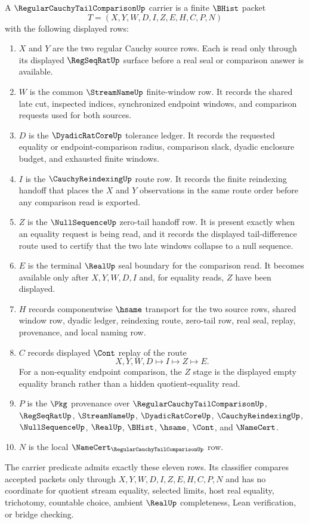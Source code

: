 \begin{definition}
\label{def:regular-cauchy-tail-comparison-carrier}
A $\RegularCauchyTailComparisonUp$ carrier is a finite $\BHist$ packet
$$
T=(X,Y,W,D,I,Z,E,H,C,P,N)
$$
with the following displayed rows:
\begin{enumerate}
\item $X$ and $Y$ are the two regular Cauchy source rows. Each is read only through its displayed $\RegSeqRatUp$ surface before a real seal or comparison answer is available.
\item $W$ is the common $\StreamNameUp$ finite-window row. It records the shared late cut, inspected indices, synchronized endpoint windows, and comparison requests used for both sources.
\item $D$ is the $\DyadicRatCoreUp$ tolerance ledger. It records the requested equality or endpoint-comparison radius, comparison slack, dyadic enclosure budget, and exhausted finite windows.
\item $I$ is the $\CauchyReindexingUp$ route row. It records the finite reindexing handoff that places the $X$ and $Y$ observations in the same route order before any comparison read is exported.
\item $Z$ is the $\NullSequenceUp$ zero-tail handoff row. It is present exactly when an equality request is being read, and it records the displayed tail-difference route used to certify that the two late windows collapse to a null sequence.
\item $E$ is the terminal $\RealUp$ seal boundary for the comparison read. It becomes available only after $X,Y,W,D,I$ and, for equality reads, $Z$ have been displayed.
\item $H$ records componentwise $\hsame$ transport for the two source rows, shared window row, dyadic ledger, reindexing route, zero-tail row, real seal, replay, provenance, and local naming row.
\item $C$ records displayed $\Cont$ replay of the route
$$
X,Y,W,D \longmapsto I \longmapsto Z \longmapsto E .
$$
For a non-equality endpoint comparison, the $Z$ stage is the displayed empty equality branch rather than a hidden quotient-equality read.
\item $P$ is the $\Pkg$ provenance over $\RegularCauchyTailComparisonUp$, $\RegSeqRatUp$, $\StreamNameUp$, $\DyadicRatCoreUp$, $\CauchyReindexingUp$, $\NullSequenceUp$, $\RealUp$, $\BHist$, $\hsame$, $\Cont$, and $\NameCert$.
\item $N$ is the local $\NameCert_{\RegularCauchyTailComparisonUp}$ row.
\end{enumerate}
The carrier predicate admits exactly these eleven rows. Its classifier compares accepted packets only through $X,Y,W,D,I,Z,E,H,C,P,N$ and has no coordinate for quotient stream equality, selected limits, host real equality, trichotomy, countable choice, ambient $\RealUp$ completeness, Lean verification, or bridge checking.
\end{definition}

